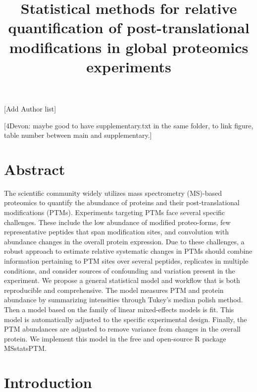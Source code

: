 \documentclass[mcp]{article}
\title{Statistical methods for relative quantification of post-translational modifications in global proteomics experiments}
\date{}
\numberwithin{figure}{section} %
\numberwithin{table}{section}
\def\todo#1{{\color{red}[#1]}}
\def\devon#1{{\color{green}[4Devon: #1]}}
\begin{document}
\maketitle
\todo{Add Author list}
%

\devon{maybe good to have supplementary.txt in the same folder, to link figure, table number between main and supplementary.}

\section{Abstract}

The scientific community widely utilizes mass spectrometry (MS)-based proteomics to quantify the abundance of proteins and their post-translational modifications (PTMs). Experiments targeting PTMs face several specific challenges. These include the low abundance of modified proteo-forms, few representative peptides that span modification sites, and convolution with abundance changes in the overall protein expression. Due to these challenges, a robust approach to estimate relative systematic changes in PTMs should combine information pertaining to PTM sites over several peptides, replicates in multiple conditions, and consider sources of confounding and variation present in the experiment. We propose a general statistical model and workflow that is both reproducible and comprehensive. The model measures PTM and protein abundance by summarizing intensities through Tukey’s median polish method. Then a model based on the family of linear mixed-effects models is fit. This model is automatically adjusted to the specific experimental design. Finally, the PTM abundances are adjusted to remove variance from changes in the overall protein. We implement this model in the free and open-source R package MSstatsPTM.


\section{Introduction}
\end{document}
